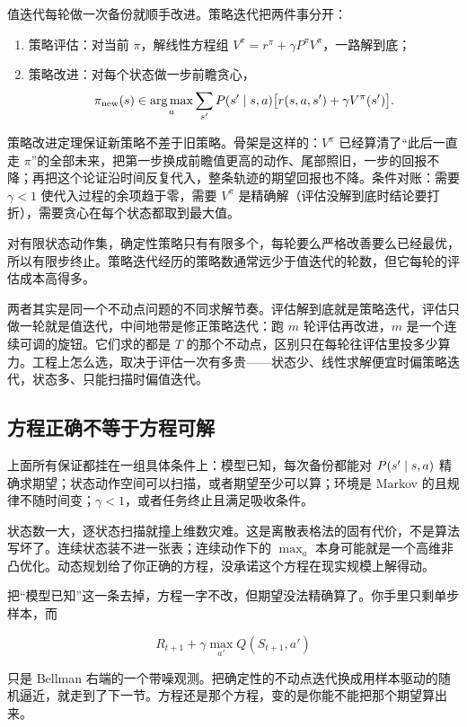 值迭代每轮做一次备份就顺手改进。策略迭代把两件事分开：

\begin{enumerate}
\tightlist
\item
  策略评估：对当前 \(\pi\)，解线性方程组 \(V^\pi = r^\pi + \gamma P^\pi V^\pi\)，一路解到底；
\item
  策略改进：对每个状态做一步前瞻贪心，
  \[
  \pi_{\text{new}}(s) \in \operatorname*{arg\,max}_a \sum_{s'} P(s' \mid s, a)
  \bigl[ r(s, a, s') + \gamma V^\pi(s') \bigr].
  \]
\end{enumerate}

策略改进定理保证新策略不差于旧策略。骨架是这样的：\(V^\pi\) 已经算清了``此后一直走 \(\pi\)''的全部未来，把第一步换成前瞻值更高的动作、尾部照旧，一步的回报不降；再把这个论证沿时间反复代入，整条轨迹的期望回报也不降。条件对账：需要 \(\gamma<1\) 使代入过程的余项趋于零，需要 \(V^\pi\) 是精确解（评估没解到底时结论要打折），需要贪心在每个状态都取到最大值。

对有限状态动作集，确定性策略只有有限多个，每轮要么严格改善要么已经最优，所以有限步终止。策略迭代经历的策略数通常远少于值迭代的轮数，但它每轮的评估成本高得多。

两者其实是同一个不动点问题的不同求解节奏。评估解到底就是策略迭代，评估只做一轮就是值迭代，中间地带是修正策略迭代：跑 \(m\) 轮评估再改进，\(m\) 是一个连续可调的旋钮。它们求的都是 \(T\) 的那个不动点，区别只在每轮往评估里投多少算力。工程上怎么选，取决于评估一次有多贵——状态少、线性求解便宜时偏策略迭代，状态多、只能扫描时偏值迭代。

\subsection{方程正确不等于方程可解}

上面所有保证都挂在一组具体条件上：模型已知，每次备份都能对 \(P(s'\mid s,a)\) 精确求期望；状态动作空间可以扫描，或者期望至少可以算；环境是 Markov 的且规律不随时间变；\(\gamma<1\)，或者任务终止且满足吸收条件。

状态数一大，逐状态扫描就撞上维数灾难。这是离散表格法的固有代价，不是算法写坏了。连续状态装不进一张表；连续动作下的 \(\max_a\) 本身可能就是一个高维非凸优化。动态规划给了你正确的方程，没承诺这个方程在现实规模上解得动。

把``模型已知''这一条去掉，方程一字不改，但期望没法精确算了。你手里只剩单步样本，而

\[
R_{t+1} + \gamma \max_{a'} Q(S_{t+1}, a')
\]

只是 Bellman 右端的一个带噪观测。把确定性的不动点迭代换成用样本驱动的随机逼近，就走到了下一节。方程还是那个方程，变的是你能不能把那个期望算出来。
